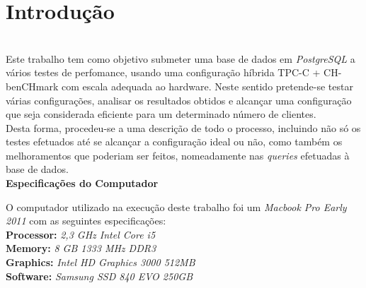 \section{Introdução}\\

Este trabalho tem como objetivo submeter uma base de dados em \textit{PostgreSQL} a vários testes de perfomance, usando uma configuração híbrida TPC-C + CH-benCHmark com escala adequada ao hardware. Neste sentido pretende-se testar várias configurações, analisar os resultados obtidos e alcançar uma configuração que seja considerada eficiente para um determinado número de clientes.\\

Desta forma, procedeu-se a uma descrição de todo o processo, incluindo não só os testes efetuados até se alcançar a configuração ideal ou não, como também os melhoramentos que poderiam ser feitos, nomeadamente nas \textit{queries} efetuadas à base de dados.\\


\textbf{Especificações do Computador}

O computador utilizado na execução deste trabalho foi um \textit{Macbook Pro Early 2011} com as seguintes especificações:\\

\textbf{Processor:} \textit{2,3 GHz Intel Core i5} \\

\textbf{Memory:} \textit{8 GB 1333 MHz DDR3} \\

\textbf{Graphics:} \textit{Intel HD Graphics 3000 512MB} \\

\textbf{Software:} \textit{Samsung SSD 840 EVO 250GB} \\
